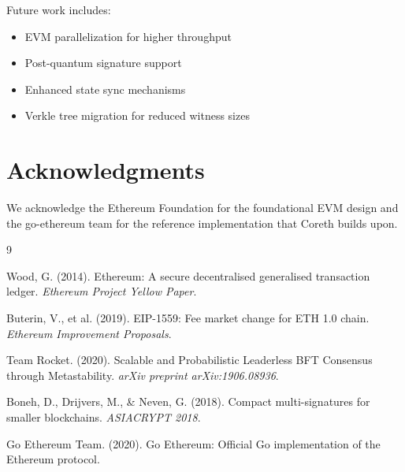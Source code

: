 \documentclass[11pt,letterpaper]{article}
\begin{document}
Future work includes:
\begin{itemize}
    \item EVM parallelization for higher throughput
    \item Post-quantum signature support
    \item Enhanced state sync mechanisms
    \item Verkle tree migration for reduced witness sizes
\end{itemize}

\section*{Acknowledgments}

We acknowledge the Ethereum Foundation for the foundational EVM design and the go-ethereum team for the reference implementation that Coreth builds upon.


\begin{thebibliography}{9}

Wood, G. (2014). Ethereum: A secure decentralised generalised transaction ledger. \textit{Ethereum Project Yellow Paper}.

Buterin, V., et al. (2019). EIP-1559: Fee market change for ETH 1.0 chain. \textit{Ethereum Improvement Proposals}.

Team Rocket. (2020). Scalable and Probabilistic Leaderless BFT Consensus through Metastability. \textit{arXiv preprint arXiv:1906.08936}.

Boneh, D., Drijvers, M., \& Neven, G. (2018). Compact multi-signatures for smaller blockchains. \textit{ASIACRYPT 2018}.

Go Ethereum Team. (2020). Go Ethereum: Official Go implementation of the Ethereum protocol.

\end{thebibliography}
\end{document}

